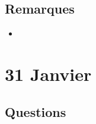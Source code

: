 \documentclass[a4paper, 11pt, hidelinks]{article}
\begin{document}
\subsection{Remarques}



\begin{itemize}
    \item 
\end{itemize}








\section{31 Janvier}


\subsection{Questions}
\end{document}
